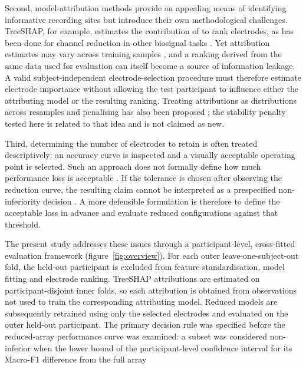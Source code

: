 Second, model-attribution methods provide an appealing means of identifying informative recording sites but introduce their own methodological challenges. TreeSHAP, for example, estimates the contribution of  \citep{lundberg2017unified,lundberg2020local} to rank electrodes, as has been done for channel reduction in other biosignal tasks \citep{salmi2025shapaad}. Yet attribution estimates may vary across training samples \citep{visani2022statistical,kelodjou2023shaping}, and a ranking derived from the same data used for evaluation can itself become a source of information leakage. A valid subject-independent electrode-selection procedure must therefore estimate electrode importance without allowing the test participant to influence either the attributing model or the resulting ranking. Treating attributions as distributions across resamples and penalising  has also been proposed \citep{xiang2026roshap,meinshausen2010stability}; the stability penalty tested here is related to that idea and is not claimed as new.

Third, determining the number of electrodes to retain is often treated descriptively: an accuracy curve is inspected and a visually acceptable operating point is selected. Such an approach does not formally define how much performance loss is acceptable \citep{schuirmann1987comparison,walker2011understanding}. If the tolerance is chosen after observing the reduction curve, the resulting claim cannot be interpreted as a prespecified non-inferiority decision \citep{campbell2018noninferiority}. A more defensible formulation is therefore to define the acceptable loss in advance and evaluate reduced configurations against that threshold.

The present study addresses these issues through a participant-level, cross-fitted evaluation framework (figure~\ref{fig:overview}). For each outer leave-one-subject-out fold, the held-out participant is excluded from feature standardisation, model fitting and electrode ranking. TreeSHAP attributions are estimated on participant-disjoint inner folds, so each attribution is obtained from observations not used to train the corresponding attributing model. Reduced models are subsequently retrained using only the selected electrodes and evaluated on the outer held-out participant. The primary decision rule was specified before the reduced-array performance curve was examined: a subset was considered non-inferior when the lower bound of the participant-level confidence interval for its Macro-F1 difference from the full array 

